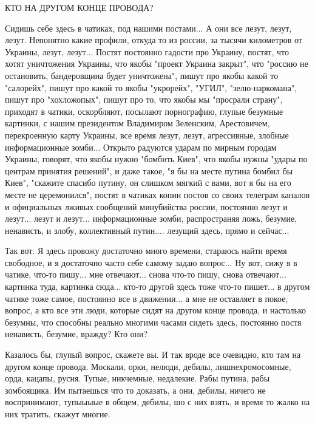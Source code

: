  
 
 
 
 


КТО НА ДРУГОМ КОНЦЕ ПРОВОДА?

Сидишь себе здесь в чатиках, под нашими постами...  А они все лезут, лезут,
лезут. Непонятно какие профили, откуда то из россии, за тысячи километров от
Украины, лезут, лезут... Постят постоянно гадости про Украину, постят, что
хотят уничтожения Украины, что якобы "проект Украина закрыт", что "россию не
остановить, бандеровщина будет уничтожена", пишут про якобы какой то
"салорейх", пишут про какой то якобы "укрорейх", "УГИЛ", "зелю-наркомана",
пишут про "хохложопых", пишут про то, что якобы мы "просрали страну", приходят
в чатики, оскорбляют, посылают порнографию, глупые безумные картинки, с нашим
президентом Владимиром Зеленским, Арестовичем, перекроенную карту Украины, все
время лезут, лезут, агрессивные, злобные информационные зомби... Открыто
радуются ударам по мирным городам Украины, говорят, что якобы нужно "бомбить
Киев", что якобы нужны "удары по центрам принятия решений", и даже такое, "я бы
на месте путина бомбил бы Киев", "скажите спасибо путину, он слишком мягкий с
вами, вот я бы на его месте не церемонился", постят в чатиках копии постов со
своих телеграм каналов и официальных лживых сообщений минубийства россии,
постоянно лезут и лезут... лезут и лезут... информационные зомби, распространяя
ложь, безумие, ненависть, и злобу, коллективный путин....  лезущий здесь, прямо
и сейчас...

Так вот. Я здесь провожу достаточно много времени, стараюсь найти время
свободное, и я достаточно часто себе самому задаю вопрос... Ну вот, сижу я в
чатике, что-то пишу...  мне отвечают... снова что-то пишу, снова отвечают...
картинка туда, картинка сюда...  кто-то другой здесь тоже что-то пишет...  в
другом чатике тоже самое, постоянно все в движении...  а мне не оставляет в
покое, вопрос, а кто все эти люди, которые сидят на другом конце провода, и
настолько безумны, что способны реально многими часами сидеть здесь, постоянно
постя ненависть, безумие, вражду? Кто они?

Казалось бы, глупый вопрос, скажете вы. И так вроде все очевидно, кто там на
другом конце провода.  Москали, орки, нелюди, дебилы, лишнехромосомные, орда,
кацапы, русня. Тупые, никчемные, недалекие. Рабы путина, рабы зомбоящика. Им пытаешься
что то доказать, а они, дебилы, ничего не воспринимают, тупыыыые в общем,
дебилы, шо с них взять, и время то жалко на них тратить, скажут многие.
